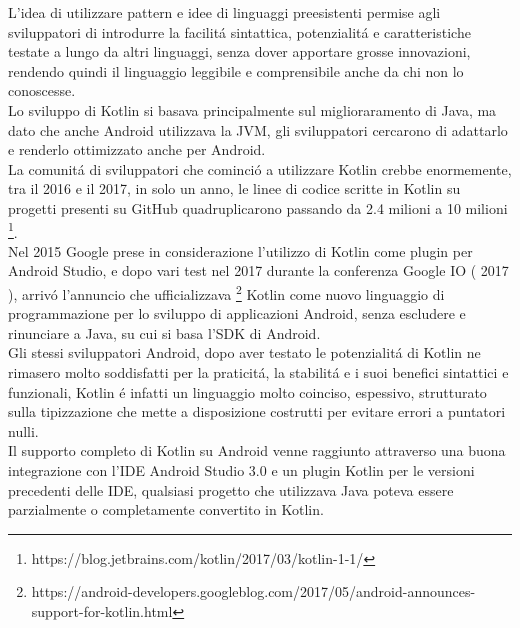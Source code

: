 L'idea di utilizzare pattern e idee di linguaggi preesistenti permise agli sviluppatori di introdurre la facilit\'a sintattica, potenzialit\'a e caratteristiche testate a lungo da altri linguaggi, senza dover apportare grosse innovazioni, rendendo quindi il linguaggio leggibile e comprensibile anche da chi non lo conoscesse.\\
Lo sviluppo di Kotlin si basava principalmente sul miglioraramento di Java, ma dato che anche Android utilizzava la JVM, gli sviluppatori cercarono di adattarlo e renderlo ottimizzato anche per Android.\\
La comunit\'a di sviluppatori che cominci\'o a utilizzare Kotlin crebbe enormemente, tra il 2016 e il 2017, in solo un anno, le linee di codice scritte in Kotlin su progetti presenti su GitHub quadruplicarono passando da 2.4 milioni a 10 milioni \footnote{https://blog.jetbrains.com/kotlin/2017/03/kotlin-1-1/}. \\
Nel 2015 Google prese in considerazione l'utilizzo di Kotlin come plugin per Android Studio, e dopo vari test nel 2017 durante la conferenza Google IO ( 2017 ), arriv\'o l'annuncio che ufficializzava \footnote{https://android-developers.googleblog.com/2017/05/android-announces-support-for-kotlin.html} Kotlin come nuovo linguaggio di programmazione per lo sviluppo di applicazioni Android, senza escludere e rinunciare a Java, su cui si basa l'SDK di Android.\\
Gli stessi sviluppatori Android, dopo aver testato le potenzialit\'a di Kotlin ne rimasero molto soddisfatti per la praticit\'a, la stabilit\'a e i suoi benefici sintattici e funzionali, Kotlin \'e infatti un linguaggio molto coinciso, espessivo, strutturato sulla tipizzazione che mette a disposizione costrutti per evitare errori a puntatori nulli.\\
Il supporto completo di Kotlin su Android venne raggiunto attraverso una buona integrazione con l'IDE Android Studio 3.0 e un plugin Kotlin per le versioni precedenti delle IDE, qualsiasi progetto che utilizzava Java poteva essere parzialmente o completamente convertito in Kotlin.





